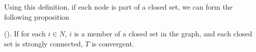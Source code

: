 Using this definition, if each node is part of a closed set, we can form the following proposition

\begin{proposition}{(\citet{golubNaiveLearningSocial2010}).}
    If for each \(i \in N\), \(i\) is a member of a closed set in the graph, and each closed set is strongly connected, \(T\) is convergent.
\end{proposition}








